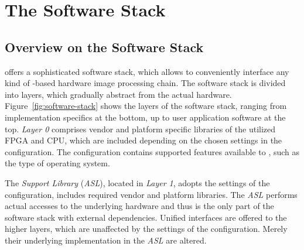 






\chapter{The \asterics Software Stack} \label{ch:04-software}




\section{Overview on the \asterics Software Stack}


\asterics offers a sophisticated software stack, which allows to conveniently interface any kind of \asterics-based hardware image processing chain. 
The software stack is divided into layers, which gradually abstract from the actual hardware. 
Figure~\ref{fig:software-stack} shows the layers of the \asterics software stack, ranging from implementation specifics at the bottom, up to user application software at the top. 
\textit{Layer 0} comprises vendor and platform specific libraries of the utilized FPGA and CPU, which are included depending on the chosen settings in the \asterics configuration. 
The \asterics configuration contains supported features available to \asterics, such as the type of operating system.
 
The \asterics \textit{Support Library} (\textit{ASL}), located in \textit{Layer 1}, adopts the settings of the \asterics configuration, includes required vendor and platform libraries. 
The \textit{ASL} performs actual accesses to the underlying hardware and thus is the only part of the \asterics software stack with external dependencies. 
Unified interfaces are offered to the higher layers, which are unaffected by the settings of the \asterics configuration. 
Merely their underlying implementation in the \textit{ASL} are altered. 

